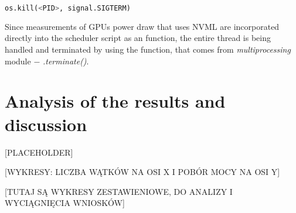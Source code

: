 \begin{lstlisting}[language=Python]
    os.kill(<PID>, signal.SIGTERM)
\end{lstlisting}

Since measurements of GPUs power draw that uses NVML are incorporated directly
into the scheduler script as an function, the entire thread is being handled
and terminated by using the function, that comes from \emph{multiprocessing}
module $-$ \emph{.terminate\@()}.

\section{Analysis of the results and discussion}

[PLACEHOLDER]

[WYKRESY: LICZBA WĄTKÓW NA OSI X I POBÓR MOCY NA OSI Y]

[TUTAJ SĄ WYKRESY ZESTAWIENIOWE, DO ANALIZY I WYCIĄGNIĘCIA WNIOSKÓW]

\newpage







\newpage







\newpage







\newpage







\newpage









\newpage

